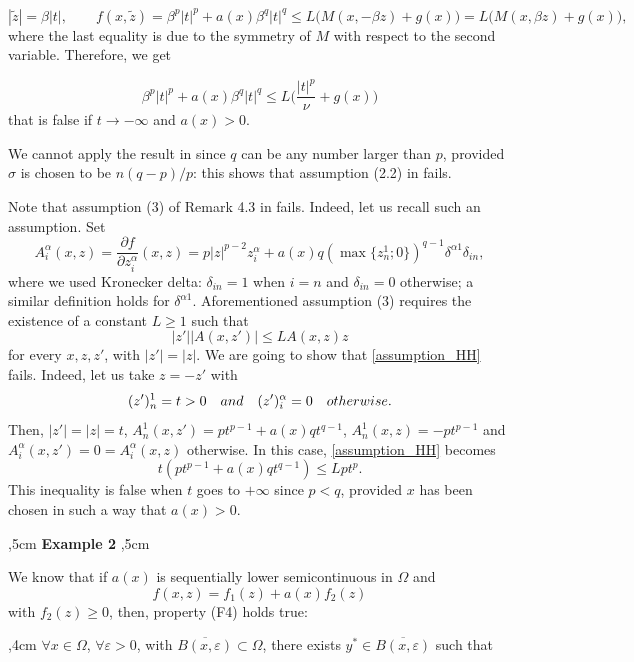 \documentclass[a4paper,10pt]{article}
\theoremstyle{plain}
\theoremstyle{definition}
\numberwithin{equation}{section} \makeatletter
\begin{document}
\[
|\tilde{z}|=\beta |t|,  \qquad f(x, \tilde{z})= \beta^p |t|^p+ a(x)\beta^q |t|^q \le L\bigg( M(x,- \beta z)+g(x)\bigg)= L\bigg( M(x,\beta z)+g(x)\bigg),
\]
where the last equality is due to the symmetry of $M$ with respect to the second variable. Therefore, we get

\[
\beta^p |t|^p+ a(x)\beta^q |t|^q \le L\bigg( \frac{|t|^p}{\nu}+g(x)\bigg)
\]
that is false if $t \rightarrow - \infty$ and $a(x)>0$.

\noindent
We cannot apply the result in \cite{Koch-Ruf-Schaffner} since $q$ can be any number larger than $p$, provided $\sigma$ is chosen to be $n(q-p)/p$: this shows that assumption (2.2) in \cite{Koch-Ruf-Schaffner} fails.

\noindent
Note that assumption (3) of Remark 4.3 in \cite{HH} fails. Indeed, let us recall such an assumption. Set 
$$
A^\alpha_i (x,z) = \frac{\partial f}{\partial z^\alpha_i}(x,z)
= p |z|^{p-2} z^\alpha_i + a(x) q ( \max \{ z^1_n ; 0 \})^{q-1} \delta^{\alpha 1} \delta_{i n},
$$ 
where we used Kronecker delta: $\delta_{i n}=1$ when $i = n$ and $\delta_{i n}=0$ otherwise; a similar definition holds for $\delta^{\alpha 1}$.
Aforementioned assumption (3) requires the existence of a constant $L \geq 1$ such that
\begin{equation}
\label{assumption_HH}
|z'| |A(x,z')| \leq L A(x,z) z
\end{equation}
for every $x,z,z'$, with $|z'|=|z|$. 
We are going to show that \eqref{assumption_HH} fails. Indeed, let us take $z=-z'$ with 
$$
(z')^1_n = t > 0
\quad
{\rm and }
\quad
(z')^\alpha_i = 0
\quad
{\rm otherwise. }
$$
Then, $|z'|=|z|=t$, 
$A^1_n (x,z') = p t^{p-1} + a(x) q t^{q-1}$, 
$A^1_n (x,z) = - p t^{p-1}$ and $A^\alpha_i (x,z') = 0 = A^\alpha_i (x,z)$ otherwise.
In this case, \eqref{assumption_HH} becomes
\begin{equation}
\label{assumption_HH_bis}
t (p t^{p-1} + a(x) q t^{q-1}) \leq L p t^p.
\end{equation}
This inequality is false when $t$ goes to $+\infty$ since $p<q$, provided $x$ has been chosen in such a way that $a(x)>0$.

,5cm
\noindent
{\bf Example 2}
,5cm

\noindent We know that if $a(x)$ is sequentially lower 
 semicontinuous in $\Omega$
and
$$
f(x,z)=f_1(z)+ a(x)f_2(z)
$$ 
with $f_2(z)\ge 0$, then, property (F4) holds true:


,4cm 
\noindent $\forall x\in \Omega$, $\forall \varepsilon >0$, with $\overline{B(x,\varepsilon)}\subset \Omega$, there exists $y^*\in \overline{B(x,\varepsilon)} $ such that 
\end{document}
